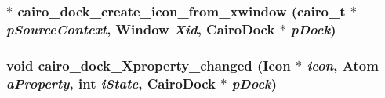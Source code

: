 \subsubsection{$\ast$ cairo\_\-dock\_\-create\_\-icon\_\-from\_\-xwindow (cairo\_\-t $\ast$ {\em pSourceContext}, Window {\em Xid}, {\bf CairoDock} $\ast$ {\em pDock})}\label{cairo-dock-application-factory_8h_e28b5fa69e1fb9cf38fccc6ba95e0efc}


\subsubsection{\setlength{\rightskip}{0pt plus 5cm}void cairo\_\-dock\_\-Xproperty\_\-changed ({\bf Icon} $\ast$ {\em icon}, Atom {\em aProperty}, int {\em iState}, {\bf CairoDock} $\ast$ {\em pDock})}\label{cairo-dock-application-factory_8h_ad3e753de8bc7fc717a7f81f87d7b8fa}


